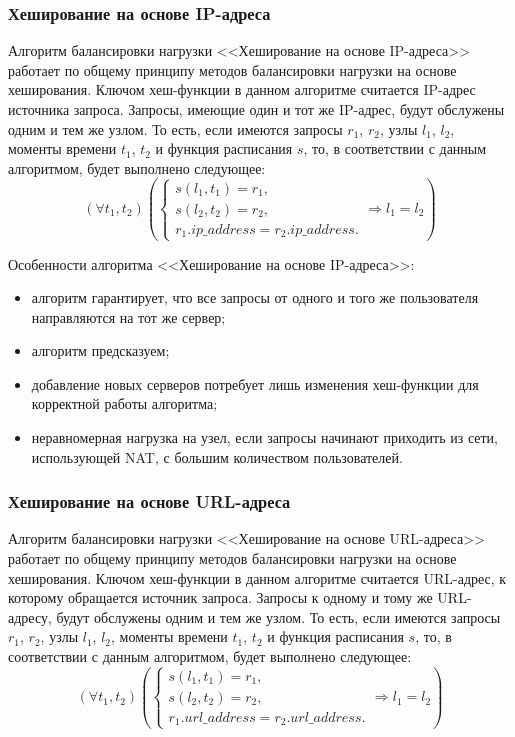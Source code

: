 \subsubsection*{Хеширование на основе IP-адреса}

Алгоритм балансировки нагрузки <<Хеширование на основе IP-адреса>> работает по общему принципу методов балансировки нагрузки на основе хеширования.
Ключом хеш-функции в данном алгоритме считается IP-адрес источника запроса.
Запросы, имеющие один и тот же IP-адрес, будут обслужены одним и тем же узлом.
То есть, если имеются запросы $r_1$, $r_2$, узлы $l_1$, $l_2$, моменты времени $t_1$, $t_2$ и функция расписания $s$, то, в соответствии с данным алгоритмом, будет выполнено следующее:
\begin{equation}
    (\forall t_1, t_2) \left(\begin{cases}
        s(l_1, t_1) = r_1, \\
        s(l_2, t_2) = r_2, \\
        r_1.ip\_address = r_2.ip\_address.
    \end{cases} \Rightarrow l_1 = l_2 \right)
\end{equation}

Особенности алгоритма <<Хеширование на основе IP-адреса>>:
\begin{itemize}
    \item алгоритм гарантирует, что все запросы от одного и того же пользователя направляются на тот же сервер;
    \item алгоритм предсказуем;
    \item добавление новых серверов потребует лишь изменения хеш-функции для корректной работы алгоритма;
    \item неравномерная нагрузка на узел, если запросы начинают приходить из сети, использующей NAT, с большим количеством пользователей.
\end{itemize}

\subsubsection*{Хеширование на основе URL-адреса}

Алгоритм балансировки нагрузки <<Хеширование на основе URL-адреса>> работает по общему принципу методов балансировки нагрузки на основе хеширования.
Ключом хеш-функции в данном алгоритме считается URL-адрес, к которому обращается источник запроса.
Запросы к одному и тому же URL-адресу, будут обслужены одним и тем же узлом.
То есть, если имеются запросы $r_1$, $r_2$, узлы $l_1$, $l_2$, моменты времени $t_1$, $t_2$ и функция расписания $s$, то, в соответствии с данным алгоритмом, будет выполнено следующее:
\begin{equation}
    (\forall t_1, t_2) \left(\begin{cases}
        s(l_1, t_1) = r_1, \\
        s(l_2, t_2) = r_2, \\
        r_1.url\_address = r_2.url\_address.
    \end{cases} \Rightarrow l_1 = l_2 \right)
\end{equation}

